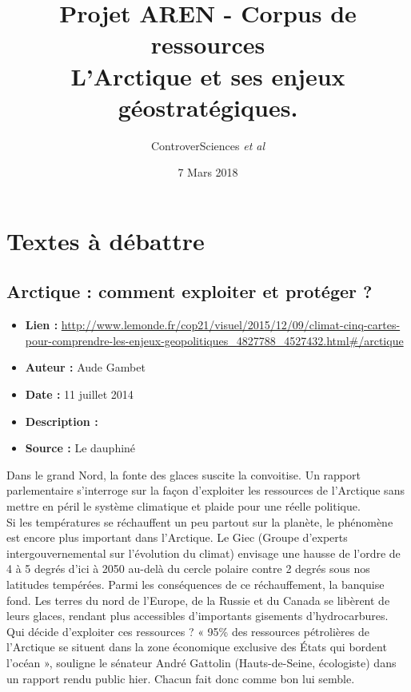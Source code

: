 \documentclass[8pt]{article}
\author{ControverSciences\textit{ et al} }
\title{Projet AREN - Corpus de ressources \\ L’Arctique et ses enjeux géostratégiques.}
\date{7 Mars 2018}
\begin{document}
\maketitle

\tableofcontents

\newpage
\section{Textes à débattre}

\subsection{ Arctique : comment exploiter et protéger ? }

\begin{itemize}
	\item \textbf{Lien : }  \url{http://www.lemonde.fr/cop21/visuel/2015/12/09/climat-cinq-cartes-pour-comprendre-les-enjeux-geopolitiques_4827788_4527432.html#/arctique} 
	\item \textbf{Auteur : }  Aude Gambet
	\item \textbf{Date : } 11 juillet 2014
	\item \textbf{Description : }
	\item \textbf{Source : } Le dauphiné
\end{itemize}

Dans le grand Nord, la fonte des glaces suscite la convoitise. Un rapport parlementaire s’interroge sur la façon d’exploiter les ressources de l’Arctique sans mettre en péril le système climatique et plaide pour une réelle politique.\\

Si les températures se réchauffent un peu partout sur la planète, le phénomène est encore plus important dans l’Arctique. Le Giec (Groupe d’experts intergouvernemental sur l’évolution du climat) envisage une hausse de l’ordre de 4 à 5 degrés d’ici à 2050 au-delà du cercle polaire contre 2 degrés sous nos latitudes tempérées. Parmi les conséquences de ce réchauffement, la banquise fond. Les terres du nord de l’Europe, de la Russie et du Canada se libèrent de leurs glaces, rendant plus accessibles d’importants gisements d’hydrocarbures.\\

Qui décide d’exploiter ces ressources ? « 95\% des ressources pétrolières de l’Arctique se situent dans la zone économique exclusive des États qui bordent l’océan », souligne le sénateur André Gattolin (Hauts-de-Seine, écologiste) dans un rapport rendu public hier. Chacun fait donc comme bon lui semble.\\
\end{document}
